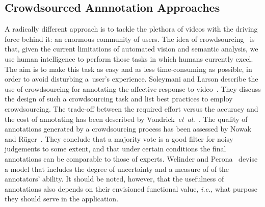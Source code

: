\documentclass[runningheads,a4paper]{llncs}
\begin{document}
\subsection{Crowdsourced Annnotation Approaches}
A radically different approach is to tackle the plethora of videos with the driving force behind it: an enormous community of users. The idea of crowdsourcing~\cite{Doan:2011} is that, given the current limitations of automated vision and semantic analysis, we use human intelligence to perform those tasks in which humans currently excel.
The aim is to make this task as easy and as less time-consuming as possible, in order to avoid disturbing a~user's experience. Soleymani and Larson describe the use of crowdsourcing for annotating the affective response to video~\cite{Soleymani:2010}. They discuss the design of such a crowdsourcing task and list best practices to employ crowdsourcing. The trade-off between the required effort versus the accuracy and the cost of annotating has been described by Vondrick~\emph{et~al.}~\cite{Vondrick:2010}. The quality of annotations generated by a crowdsourcing process has been assessed by Nowak and R\"{u}ger~\cite{Nowak:2010}. They conclude that a majority vote is a good filter for noisy judgements to some extent, and that under certain conditions the final annotations can be comparable to those of experts. Welinder and Perona~\cite{Welinder:2010} devise a model that includes the degree of uncertainty and a measure of of the annotators' ability. It should be noted, however, that the usefulness of annotations also depends on their envisioned functional value, \emph{i.e.}, what purpose they should serve in the application.
\end{document}
